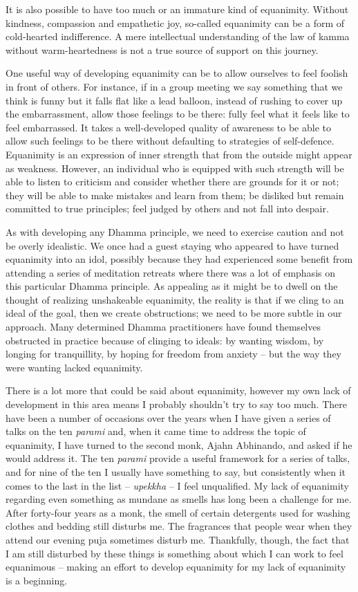 It is also possible to have too much or an immature kind of equanimity.
Without kindness, compassion and empathetic joy, so-called equanimity
can be a form of cold-hearted indifference. A mere intellectual
understanding of the law of kamma without warm-heartedness is not a true
source of support on this journey.

One useful way of developing equanimity can be to allow ourselves to
feel foolish in front of others. For instance, if in a group meeting we
say something that we think is funny but it falls flat like a lead
balloon, instead of rushing to cover up the embarrassment, allow those
feelings to be there: fully feel what it feels like to feel embarrassed.
It takes a well-developed quality of awareness to be able to allow such
feelings to be there without defaulting to strategies of self-defence.
Equanimity is an expression of inner strength that from the outside
might appear as weakness. However, an individual who is equipped with
such strength will be able to listen to criticism and consider whether
there are grounds for it or not; they will be able to make mistakes and
learn from them; be disliked but remain committed to true principles;
feel judged by others and not fall into despair.

As with developing any Dhamma principle, we need to exercise caution and
not be overly idealistic. We once had a guest staying who appeared to
have turned equanimity into an idol, possibly because they had
experienced some benefit from attending a series of meditation retreats
where there was a lot of emphasis on this particular Dhamma principle.
As appealing as it might be to dwell on the thought of \mbox{realizing} unshakeable equanimity,
the reality is that if we cling to an ideal of the goal, then we create
obstructions; we need to be more subtle in our approach. Many determined
Dhamma practitioners have found themselves obstructed in practice
because of clinging to ideals: by wanting wisdom, by longing for
tranquillity, by hoping for freedom from anxiety -- but the way they
were wanting lacked equanimity.

There is a lot more that could be said about equanimity, however my own
lack of development in this area means I probably shouldn't try to say
too much. There have been a number of occasions over the years when I
have given a series of talks on the ten \emph{parami} and, when it came
time to address the topic of equanimity, I have turned to the second
monk, Ajahn Abhinando, and asked if he would address it. The ten
\emph{parami} provide a useful framework for a series of talks, and for
nine of the ten I usually have something to say, but consistently when
it comes to the last in the list -- \emph{upekkha} -- I feel
unqualified. My lack of equanimity regarding even something as mundane
as smells has long been a challenge for me. After forty-four years as a
monk, the smell of certain detergents used for washing clothes and
bedding still disturbs me. The fragrances that people wear when they
attend our evening puja sometimes disturb me. Thankfully, though, the
fact that I am still disturbed by these things is something about which
I can work to feel equanimous -- making an effort to develop equanimity for my lack of
equanimity is a beginning.

